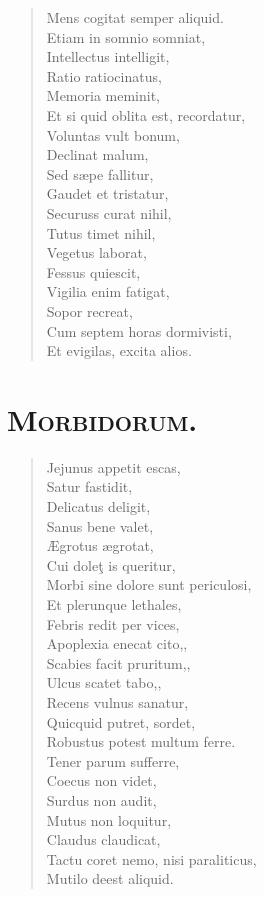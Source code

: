 \documentclass[12pt,  postvopaper]{memoir}
\begin{document}
\begin{verse}

  Mens cogitat semper aliquid.\\
  Etiam in somnio somniat,\\
  Intellectus intelligit,\\
  Ratio ratiocinatus,\\
  Memoria meminit,\\
  Et si quid oblita est, recordatur,\\
  Voluntas vult bonum,\\
  Declinat malum,\\
  Sed sæpe fallitur,\\
  Gaudet et tristatur,\\
  Securuss curat nihil,\\
  Tutus timet nihil,\\
  Vegetus laborat,\\
  Fessus quiescit,\\
  Vigilia enim fatigat,\\
  Sopor recreat,\\
  Cum septem horas dormivisti,\\
  Et evigilas, excita alios.\\
\end{verse}


\section*{\textsc{Morbidorum.}}

\begin{verse}

  Jejunus appetit escas,\\
  Satur fastidit,\\
  Delicatus deligit,\\
  Sanus bene valet,\\
  Ægrotus ægrotat,\\
  Cui doleţ is queritur,\\
  Morbi sine dolore sunt periculosi,\\
  Et plerunque lethales,\\
  Febris redit per vices,\\
  Apoplexia enecat cito,,\\
  Scabies facit pruritum,,\\
  Ulcus scatet tabo,,\\
  Recens vulnus sanatur,\\
  Quicquid putret, sordet,\\
  Robustus potest multum ferre.\\
  Tener parum sufferre,\\
  Coecus non videt,\\
  Surdus non audit,\\
  Mutus non loquitur,\\
  Claudus claudicat,\\
  Tactu coret nemo, nisi paraliticus,\\
  Mutilo deest aliquid.\\
\end{verse}
\end{document}

